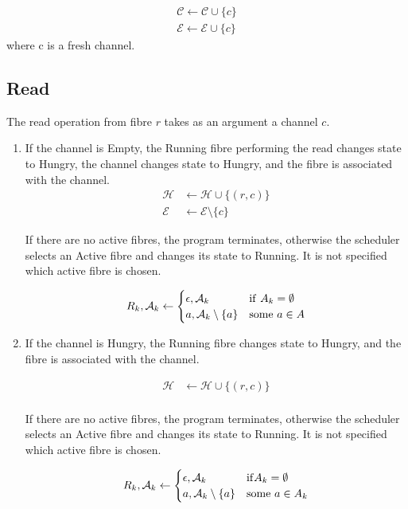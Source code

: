 \documentclass[oneside]{book}
\begin{document}
\begin{align}
{\mathcal C} \leftarrow {\mathcal C} \cup \{c\}\\
{\mathcal E} \leftarrow {\mathcal E} \cup \{c\}
\end{align}
where c is a fresh channel.

\subsection{Read}
The read operation from fibre $r$ takes as an argument a channel $c$.

\begin{enumerate}
\item If the channel is Empty, the Running fibre performing the read
changes state to Hungry, the channel changes state to Hungry,
and the fibre is associated with the channel.
\begin{align}
{\mathcal H}&\leftarrow {\mathcal H} \cup \{(r,c)\}\\
{\mathcal E} &\leftarrow {\mathcal E} \setminus \{c\}
\end{align}

If there are no active fibres, the program terminates,
otherwise the scheduler selects an Active fibre and
changes its state to Running.  It is not specified which active 
fibre is chosen.

\begin{equation}
R_k,{\mathcal A_k} \leftarrow
\begin{cases}
\epsilon,{\mathcal A_k}& {\rm if\ } A_k=\emptyset \\
a,{\mathcal A_k} \setminus \{a\} & {\rm some\ } a\in A
\end{cases}
\end{equation}


\item If the channel is Hungry, the Running fibre changes state
to Hungry, and the fibre is associated with the channel.

\begin{align}
{\mathcal H}&\leftarrow {\mathcal H} \cup \{(r,c)\}\\
\end{align}

If there are no active fibres, the program terminates,
otherwise the scheduler selects an Active fibre and
changes its state to Running.  It is not specified which active 
fibre is chosen.

\begin{equation}
R_k,{\mathcal A_k} \leftarrow
\begin{cases}
\epsilon,{\mathcal A_k}& {\rm if} A_k=\emptyset \\
a,{\mathcal A_k} \setminus \{a\} & {\rm some\ } a\in A_k
\end{cases}
\end{equation}



\end{enumerate}
\end{document}
